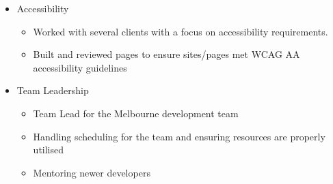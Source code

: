 \documentclass[11pt,a4paper,sans]{moderncv}        %
\begin{document}
{\begin{itemize}
\begin{itemize}
          \item Helped start and build a multi-purpose Gulp based build system for use on a wide variety of projects.
          \item Integrated a wide number of common build tasks (SASS/Babel/Testing) into a single common project which could be used for almost any project
        \end{itemize}
      \item Accessibility
      \begin{itemize}
        \item Worked with several clients with a focus on accessibility requirements.
        \item Built and reviewed pages to ensure sites/pages met WCAG AA accessibility guidelines
      \end{itemize}
      \item Team Leadership
        \begin{itemize}
          \item Team Lead for the Melbourne development team
          \item Handling scheduling for the team and ensuring resources are properly utilised
          \item Mentoring newer developers
        \end{itemize}
      \end{itemize}}
\end{document}
